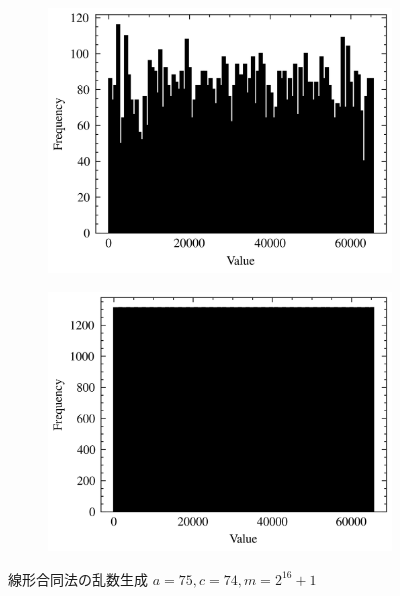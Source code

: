 \begin{figure}
\begin{subfigure}{0.48\linewidth}
		\includegraphics[width=\linewidth]{src/figures/lcg-plot/zx/lcg-2-12.png}
	\end{subfigure}
	\begin{subfigure}{0.48\linewidth}
		\centering
		\includegraphics[width=\linewidth]{src/figures/lcg-plot/zx/lcg-2-16.png}
	\end{subfigure}
	\caption{線形合同法の乱数生成 $a=75, c=74, m=2^{16}+1$}\label{fig:lcg-zx}
\end{figure}

